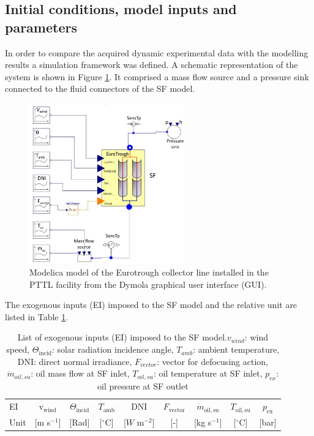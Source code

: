 \documentclass[final,3p,times,review]{elsarticle}
\begin{document}
\subsection{Initial conditions, model inputs and parameters}
%
\label{subsec:SF_model}
In order to compare the acquired dynamic experimental data with the modelling results a simulation framework was defined. A schematic representation of the system is shown in Figure \ref{fig:SF_ModModel}. It comprised a mass flow source and a pressure sink connected to the fluid connectors of the SF model. 
%
\begin{figure}[h!]
\centering
\includegraphics[width=0.6\textwidth]{Figures/Modelica_SF_v1crop.pdf}
\caption{Modelica model of the Eurotrough collector line installed in the PTTL facility from the Dymola graphical user interface (GUI).}
\label{fig:SF_ModModel}
\end{figure}
%
The exogenous inputs (EI) imposed to the SF model and the relative unit are listed in Table \ref{Tab:SF_Inputs}. 
%
\begin{table}[h!]
\centering
\caption{List of exogenous inputs (EI) imposed to the SF model.$v_{wind}$: wind speed, $\Theta_\mathrm{incid}$: solar radiation incidence angle, $T_{amb}$: ambient temperature, DNI: direct normal irradiance, $F_{vector}$: vector for defocusing action, $\dot{m}_{oil,su}$: oil mass flow at SF inlet,  $T_{oil,su}$: oil temperature at SF inlet, $p_{ex}$: oil pressure at SF outlet}
\begin{tabular}{lcccccccc}
\toprule
EI   & v$_\mathrm{wind}$   & $\Theta_\mathrm{incid}$ & $T_\mathrm{amb}$      & DNI                & $F_\mathrm{vector}$   & $\dot{m}_\mathrm{oil,su}$ & $T_\mathrm{oil,su}$   & $p_\mathrm{ex}$ \\
Unit & [m s$^{-1}$] & [Rad]    &  [$^{\circ}$C] &  [$W$ m$^{-2}$]      & [-]            &  [kg s$^{-1}$]     &  [$^{\circ}$C] &  [bar] \\
\bottomrule
\end{tabular}
\label{Tab:SF_Inputs}
\end{table}
\end{document}

